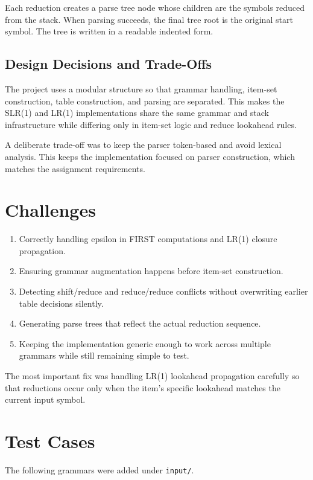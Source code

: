 \documentclass[12pt]{article}
\begin{document}
Each reduction creates a parse tree node whose children are the symbols reduced from the stack. When parsing succeeds, the final tree root is the original start symbol. The tree is written in a readable indented form.

\subsection{Design Decisions and Trade-Offs}

The project uses a modular structure so that grammar handling, item-set construction, table construction, and parsing are separated. This makes the SLR(1) and LR(1) implementations share the same grammar and stack infrastructure while differing only in item-set logic and reduce lookahead rules.

A deliberate trade-off was to keep the parser token-based and avoid lexical analysis. This keeps the implementation focused on parser construction, which matches the assignment requirements.

\section{Challenges}

\begin{enumerate}[leftmargin=1.5em]
    \item Correctly handling epsilon in FIRST computations and LR(1) closure propagation.
    \item Ensuring grammar augmentation happens before item-set construction.
    \item Detecting shift/reduce and reduce/reduce conflicts without overwriting earlier table decisions silently.
    \item Generating parse trees that reflect the actual reduction sequence.
    \item Keeping the implementation generic enough to work across multiple grammars while still remaining simple to test.
\end{enumerate}

The most important fix was handling LR(1) lookahead propagation carefully so that reductions occur only when the item's specific lookahead matches the current input symbol.

\section{Test Cases}

The following grammars were added under \texttt{input/}.
\end{document}
